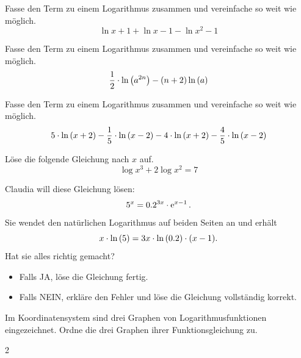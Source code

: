 \documentclass[11pt]{exam}
\begin{document}
\begin{questions}

\question[2]
Fasse den Term zu einem Logarithmus zusammen und vereinfache so weit wie möglich.
\[\ln{x+1}+\ln{x-1}-\ln{x^2-1}\]

\question[2]
Fasse den Term zu einem Logarithmus zusammen und vereinfache so weit wie möglich.
\[\frac{1}{2}\*\ln{a^{2n}}-(n+2)\ln{a}\]

\question[2]
Fasse den Term zu einem Logarithmus zusammen und vereinfache so weit wie möglich. \[5\*\ln{x+2}-\frac{1}{5}\*\ln{x-2}-4\*\ln{x+2}-\frac{4}{5}\*\ln{x-2}\]


\question[4]
Löse die folgende Gleichung nach $x$ auf. \[\log{x^3}+2\log{x^2}=7\]


\question[4]
Claudia will diese Gleichung lösen: \[5^x=0.2^{3x}\cdot\operatorname{\operatorname{e}}^{x-1}.\] Sie wendet den natürlichen Logarithmus auf beiden Seiten an und erhält \[x\*\ln{5}=3x\*\ln{0.2}\*(x-1).\] Hat sie alles richtig gemacht?
\begin{itemize}
	\item Falls JA, löse die Gleichung fertig.
	\item Falls NEIN, erkläre den Fehler und löse die Gleichung vollständig korrekt.
\end{itemize}


\question[3]
\begin{minipage}{0.6\linewidth}
    Im Koordinatensystem sind drei Graphen von Logarithmusfunktionen eingezeichnet. Ordne die drei Graphen ihrer Funktionsgleichung zu.
    \begin{parts}\begin{multicols}{2}

\end{multicols}
\end{parts}
\end{minipage}
\end{questions}
\end{document}
